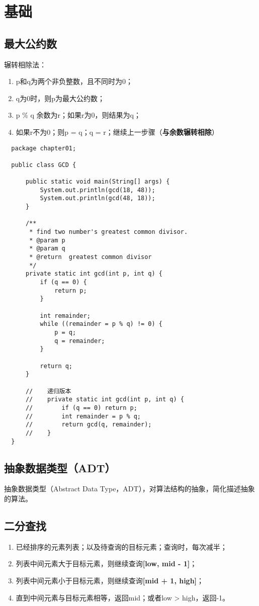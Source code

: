 \documentclass{article}
\begin{document}
\section{基础}
  \subsection{最大公约数}
  辗转相除法：
  \begin{enumerate}
    \item p和q为两个非负整数，且不同时为0；
    \item q为0时，则p为最大公约数；
    \item p \% q 余数为r；如果r为0，则结果为q；
    \item 如果r不为0；则p = q；q = r；继续上一步骤（\textbf{与余数辗转相除}）
  \end{enumerate}

  \begin{verbatim}
  package chapter01;

  public class GCD {

      public static void main(String[] args) {
          System.out.println(gcd(18, 48));
          System.out.println(gcd(48, 18));
      }

      /**
       * find two number's greatest common divisor.
       * @param p
       * @param q
       * @return  greatest common divisor
       */
      private static int gcd(int p, int q) {
          if (q == 0) {
              return p;
          }

          int remainder;
          while ((remainder = p % q) != 0) {
              p = q;
              q = remainder;
          }

          return q;
      }

      //    递归版本
      //    private static int gcd(int p, int q) {
      //        if (q == 0) return p;
      //        int remainder = p % q;
      //        return gcd(q, remainder);
      //    }
  }
  \end{verbatim}

  \subsection{抽象数据类型（ADT）}
  抽象数据类型（Abstract Data Type，ADT），对算法结构的抽象，简化描述抽象的算法。

  \subsection{二分查找}
  \begin{enumerate}
    \item 已经排序的元素列表；以及待查询的目标元素；查询时，每次减半；
    \item 列表中间元素大于目标元素，则继续查询\textbf{[low, mid - 1]}；
    \item 列表中间元素小于目标元素，则继续查询\textbf{[mid + 1, high]}；
    \item 直到中间元素与目标元素相等，返回mid；或者low > high，返回-1。
  \end{enumerate}
\end{document}
